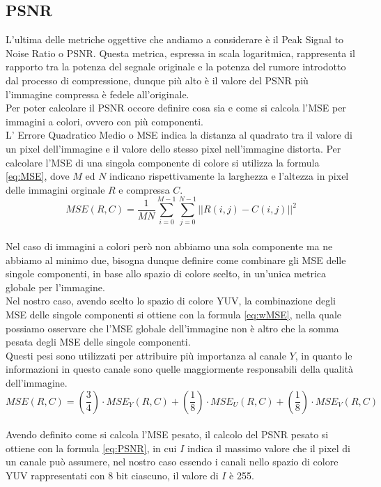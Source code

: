 \subsection{PSNR}
L’ultima delle metriche oggettive che andiamo a considerare è il Peak Signal to Noise Ratio o PSNR. Questa metrica, espressa in scala logaritmica, rappresenta il rapporto tra la potenza del segnale originale e la potenza del rumore introdotto dal processo di compressione, dunque più alto è il valore del PSNR più l’immagine compressa è fedele all’originale.\\
Per poter calcolare il PSNR occore definire cosa sia e come si calcola l’MSE per immagini a colori, ovvero con più componenti.\\
L’ Errore Quadratico Medio o MSE indica la distanza al quadrato tra il valore di un pixel dell’immagine e il valore dello stesso pixel nell’immagine distorta. Per calcolare l’MSE di una singola componente di colore si utilizza la formula \ref{eq:MSE}, dove $M$ ed $N$ indicano rispettivamente la larghezza e l'altezza in pixel delle immagini orginale $R$ e compressa $C$.\\
\begin{equation}\label{eq:MSE}
    MSE(R,C) = \dfrac{1}{MN} \sum_{i=0}^{M-1} \sum_{j=0}^{N-1} || R(i,j) - C(i,j) ||^{2}
\end{equation}\\
Nel caso di immagini a colori però non abbiamo una sola componente ma ne abbiamo al minimo due, bisogna dunque definire come combinare gli MSE delle singole componenti, in base allo spazio di colore scelto, in un’unica metrica globale per l’immagine.\\
Nel nostro caso, avendo scelto lo spazio di colore YUV, la combinazione degli MSE delle singole componenti si ottiene con la formula \ref{eq:wMSE}, nella quale possiamo osservare che l’MSE globale dell’immagine non è altro che la somma pesata degli MSE delle singole componenti.\\
Questi pesi sono utilizzati per attribuire più importanza al canale $Y$, in quanto le informazioni in questo canale sono quelle maggiormente responsabili della qualità dell’immagine.\\
\begin{equation}\label{eq:wMSE}
    MSE(R,C) = (\dfrac{3}{4}) \cdot MSE_{Y}(R,C) + (\dfrac{1}{8}) \cdot MSE_{U}(R,C)  +  (\dfrac{1}{8}) \cdot MSE_{V}(R,C)
\end{equation}\\
Avendo definito come si calcola l’MSE pesato, il calcolo del PSNR pesato si ottiene con la formula \ref{eq:PSNR}, in cui $I$ indica il massimo valore che il pixel di un canale può assumere, nel nostro caso essendo i canali nello spazio di colore YUV rappresentati con 8 bit ciascuno, il valore di $I$ è 255.\\
